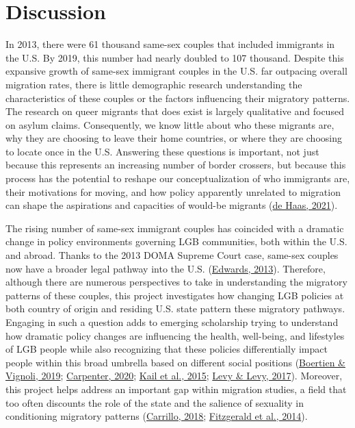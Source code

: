 \documentclass[
  11pt,
]{article}
\begin{document}
\hypertarget{discussion}{%
\section{Discussion}\label{discussion}}

In 2013, there were 61 thousand same-sex couples that included immigrants in the U.S. By 2019, this number had nearly doubled to 107 thousand. Despite this expansive growth of same-sex immigrant couples in the U.S. far outpacing overall migration rates, there is little demographic research understanding the characteristics of these couples or the factors influencing their migratory patterns. The research on queer migrants that does exist is largely qualitative and focused on asylum claims. Consequently, we know little about who these migrants are, why they are choosing to leave their home countries, or where they are choosing to locate once in the U.S. Answering these questions is important, not just because this represents an increasing number of border crossers, but because this process has the potential to reshape our conceptualization of who immigrants are, their motivations for moving, and how policy apparently unrelated to migration can shape the aspirations and capacities of would-be migrants (\protect\hyperlink{ref-dehaas_2021}{de Haas, 2021}).

The rising number of same-sex immigrant couples has coincided with a dramatic change in policy environments governing LGB communities, both within the U.S. and abroad. Thanks to the 2013 DOMA Supreme Court case, same-sex couples now have a broader legal pathway into the U.S. (\protect\hyperlink{ref-edwards_2013}{Edwards, 2013}). Therefore, although there are numerous perspectives to take in understanding the migratory patterns of these couples, this project investigates how changing LGB policies at both country of origin and residing U.S. state pattern these migratory pathways. Engaging in such a question adds to emerging scholarship trying to understand how dramatic policy changes are influencing the health, well-being, and lifestyles of LGB people while also recognizing that these policies differentially impact people within this broad umbrella based on different social positions (\protect\hyperlink{ref-boertien_2019}{Boertien \& Vignoli, 2019}; \protect\hyperlink{ref-carpenter_2020}{Carpenter, 2020}; \protect\hyperlink{ref-kail_2015}{Kail et al., 2015}; \protect\hyperlink{ref-levy_2017}{Levy \& Levy, 2017}). Moreover, this project helps address an important gap within migration studies, a field that too often discounts the role of the state and the salience of sexuality in conditioning migratory patterns (\protect\hyperlink{ref-carrillo_2018}{Carrillo, 2018}; \protect\hyperlink{ref-fitzgerald_2014}{Fitzgerald et al., 2014}).
\end{document}
